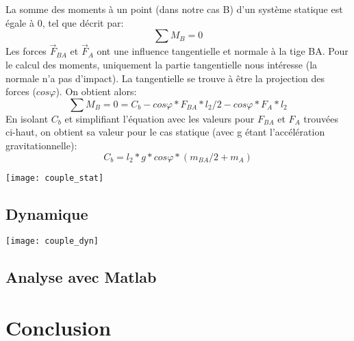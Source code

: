 \documentclass{udes_rapport} %
\begin{document}
La somme des moments à un point (dans notre cas B) d'un système statique est égale à 0, tel que décrit par:
\begin{equation}
	\sum M_B =  0
\end{equation}
Les forces $\overrightarrow F_{BA}$ et $\overrightarrow F_A$ ont une influence tangentielle et normale à la tige BA. Pour le calcul des moments, uniquement la partie tangentielle nous intéresse (la normale n'a pas d'impact). La tangentielle se trouve à être la projection des forces ($cos\varphi$). On obtient alors:
	\[	\sum M_B =  0 = C_b - cos\varphi*F_{BA}*l_2/2 - cos\varphi*F_A*l_2	\]
En isolant $C_b$ et simplifiant l'équation avec les valeurs pour $F_{BA}$ et $F_A$ trouvées ci-haut, on obtient sa valeur pour le cas statique (avec g étant l'accélération gravitationnelle):
	\[	C_b = l_2*g*cos\varphi*(m_{BA}/2+m_A)	\]
\begin{center}
	\centering
	\texttt{[image: couple\_stat]}
	\label{couple_statique}
\end{center}
\subsection{Dynamique}
\begin{center}
	\centering
	\texttt{[image: couple\_dyn]}
	\label{couple_dynamique}
\end{center}
\subsection{Analyse avec Matlab}

\section{Conclusion}

\begin{comment}
\begin{center}
	\centering
	\texttt{[image: puissance]}
	\captionof{figure}{Spectre de puissance d'une onde de 1kHz}
	\label{puissance}
\end{center}


\section{Filtres FIR}
\noindent\begin{minipage}{\textwidth} 
\begin{minipage}{0.5\textwidth}
  \centering
  \texttt{[image: ampFIR]}
  \captionof{subfigure}{Amplitude}
  \label{FIR:ampFIR}
\end{minipage}%
\begin{minipage}{0.5\textwidth}
  \centering 
  \texttt{[image: phaseCute]} 
  \captionof{subfigure}{Phase} 
  \label{FIR:phaseFIR} 
\end{minipage} 
\captionof{figure}{Filtre IIR} 
\label{FIR} 
\end{minipage}
\end{comment}
\end{document}

